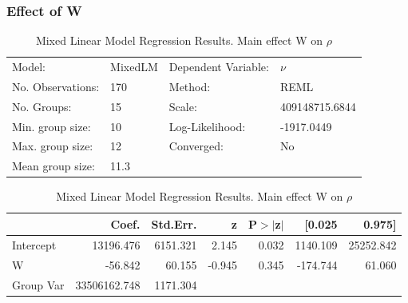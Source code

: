 \documentclass{article}
\begin{document}
\subsubsection{Effect of W}
\begin{table}
    \caption{Mixed Linear Model Regression Results. Main effect W on $\rho$}
    \label{}
    \begin{center}
    \begin{tabular}{llll}
    \hline
    Model:            & MixedLM & Dependent Variable: & $\nu$         \\
    No. Observations: & 170     & Method:             & REML            \\
    No. Groups:       & 15      & Scale:              & 409148715.6844  \\
    Min. group size:  & 10      & Log-Likelihood:     & -1917.0449      \\
    Max. group size:  & 12      & Converged:          & No              \\
    Mean group size:  & 11.3    &                     &                 \\
    \hline
    \end{tabular}
    \end{center}
    
    \begin{center}
    \begin{tabular}{lrrrrrr}
    \hline
              &        Coef. & Std.Err. &      z & P$> |$z$|$ &   [0.025 &    0.975]  \\
    \hline
    Intercept &    13196.476 & 6151.321 &  2.145 &       0.032 & 1140.109 & 25252.842  \\
    W         &      -56.842 &   60.155 & -0.945 &       0.345 & -174.744 &    61.060  \\
    Group Var & 33506162.748 & 1171.304 &        &             &          &            \\
    \hline
    \end{tabular}
    \end{center}
    \end{table}
\end{document}
